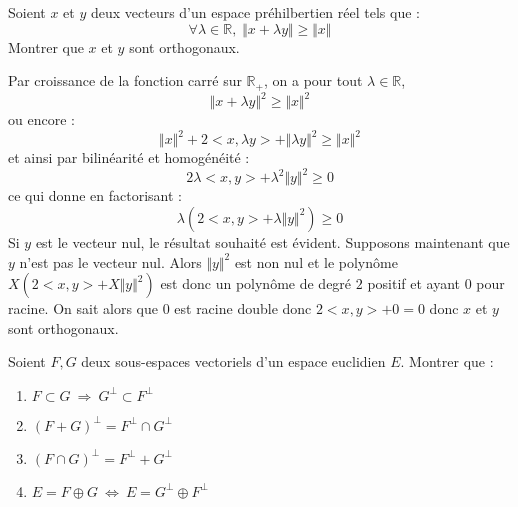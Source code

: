 \documentclass[a4paper,10pt]{report}
\begin{document}
\begin{Exa} Soient $x$ et $y$ deux vecteurs d'un espace préhilbertien réel tels que :
$$ \forall \lambda \in \mathbb{R}, \; \Vert x+\lambda y \Vert \geq \Vert x \Vert$$
Montrer que $x$ et $y$ sont orthogonaux.
\end{Exa}

\corr Par croissance de la fonction carré sur $\mathbb{R}_{+}$, on a pour tout $\lambda \in \mathbb{R}$,
$$ \Vert x+\lambda y \Vert^2 \geq \Vert x \Vert^2$$
ou encore :
$$ \Vert x \Vert^2 + 2  <x,\lambda y> + \Vert \lambda y \Vert^2 \geq \Vert x \Vert^2$$
et ainsi par bilinéarité et homogénéité :
$$ 2 \lambda <x,y> + \lambda^2 \Vert y \Vert^2 \geq 0$$
ce qui donne en factorisant :
$$ \lambda (2<x,y> + \lambda \Vert y \Vert^2) \geq 0$$
Si $y$ est le vecteur nul, le résultat souhaité est évident. Supposons maintenant que $y$ n'est pas le vecteur nul. Alors $\Vert y \Vert^2$ est non nul et le polynôme $X(2<x,y>+ X \Vert y \Vert^2)$ est donc un polynôme de degré $2$ positif et ayant $0$ pour racine. On sait alors que $0$ est racine double donc $2<x,y>+0=0$ donc $x$ et $y$ sont orthogonaux.


\begin{Exa} Soient $F, G$ deux sous-espaces vectoriels d'un espace euclidien $E.$ Montrer que :

\begin{multicols}{2}
\begin{enumerate}
\item $F\subset G \ \Longrightarrow \ G^{\perp}\subset F^{\perp}$
\item $(F+G)^{\perp}=F^{\perp}\cap G^{\perp}$
\columnbreak
\item $(F\cap G)^{\perp}=F^{\perp}+G^{\perp}$
\item $E=F\oplus G \ \Longleftrightarrow \ E=G^{\perp}\oplus F^{\perp}$
\end{enumerate}
\end{multicols}
\end{Exa}

\corr
\end{document}
